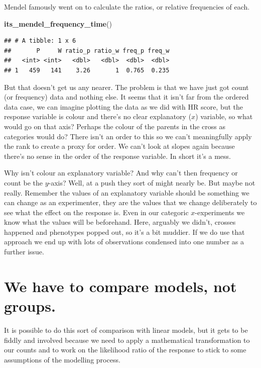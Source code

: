 \documentclass[
]{book}
\newenvironment{Shaded}{\begin{snugshade}}{\end{snugshade}}
\newcommand{\KeywordTok}[1]{\textcolor[rgb]{0.13,0.29,0.53}{\textbf{#1}}}
\newcommand{\NormalTok}[1]{#1}
\newenvironment{sidenote}
{ \begin{tcolorbox}[colbacktitle=blue!50!white,
title=huh?,coltitle=white,
fonttitle=\bfseries] }
{  \end{tcolorbox} }
\begin{document}
Mendel famously went on to calculate the ratios, or relative frequencies of each.

\begin{Shaded}
\begin{Highlighting}[]
\KeywordTok{its_mendel_frequency_time}\NormalTok{()}
\end{Highlighting}
\end{Shaded}

\begin{verbatim}
## # A tibble: 1 x 6
##       P     W ratio_p ratio_w freq_p freq_w
##   <int> <int>   <dbl>   <dbl>  <dbl>  <dbl>
## 1   459   141    3.26       1  0.765  0.235
\end{verbatim}

But that doesn't get us any nearer. The problem is that we have just got count (or frequency) data and nothing else. It seems that it isn't far from the ordered data case, we can imagine plotting the data as we did with HR score, but the response variable is colour and there's no clear explanatory (\(x\)) variable, so what would go on that axis? Perhaps the colour of the parents in the cross as categories would do? There isn't an order to this so we can't meaningfully apply the rank to create a proxy for order. We can't look at slopes again because there's no sense in the order of the response variable. In short it's a mess.

\begin{sidenote}
Why isn't colour an explanatory variable? And why can't then frequency or count be the \(y\)-axis? Well, at a push they sort of might nearly be. But maybe not really. Remember the values of an explanatory variable should be something we can change as an experimenter, they are the values that we change deliberately to see what the effect on the response is. Even in our categoric \(x\)-experiments we know what the values will be beforehand. Here, arguably we didn't, crosses happened and phenotypes popped out, so it's a bit muddier. If we do use that approach we end up with lots of observations condensed into one number as a further issue.
\end{sidenote}

\hypertarget{we-have-to-compare-models-not-groups.}{%
\section{We have to compare models, not groups.}\label{we-have-to-compare-models-not-groups.}}

It is possible to do this sort of comparison with linear models, but it gets to be fiddly and involved because we need to apply a mathematical transformation to our counts and to work on the likelihood ratio of the response to stick to some assumptions of the modelling process.
\end{document}
